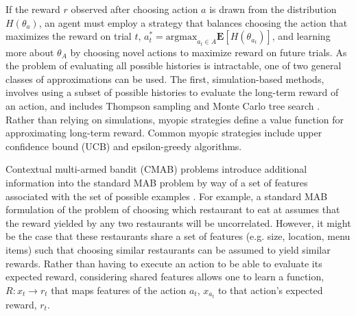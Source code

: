 \documentclass[10pt,letterpaper]{article}
\begin{document}
	If the reward $r$ observed after choosing action $a$ is drawn from the distribution $H(\theta_{a})$, an agent must employ a strategy that balances choosing the action that maximizes the reward on trial $t$, $a_{t}^{*} = \text{argmax}_{a_{t} \in A} \mathbf{E}[H(\theta_{a_{t}})]$, and learning more about $\theta_{A}$ by choosing novel actions to maximize reward on future trials. As the problem of evaluating all possible histories is intractable, one of two general classes of approximations can be used. The first, simulation-based methods, involves using a subset of possible histories to evaluate the long-term reward of an action, and includes Thompson sampling \citep{Thompson} and Monte Carlo tree search \citep{Coulom2007}. Rather than relying on simulations, myopic strategies define a value function for approximating long-term reward. Common myopic strategies include upper confidence bound (UCB) \citep{Agrawal} and epsilon-greedy \citep{Sutton1998a} algorithms.
	
	Contextual multi-armed bandit (CMAB) problems introduce additional information into the standard MAB problem by way of a set of features associated with the set of possible examples \citep{Langford}. For example, a standard MAB formulation of the problem of choosing which restaurant to eat at assumes that the reward yielded by any two restaurants will be uncorrelated. However, it might be the case that these restaurants share a set of features (e.g. size, location, menu items) such that choosing similar restaurants can be assumed to yield similar rewards. Rather than having to execute an action to be able to evaluate its expected reward, considering shared features allows one to learn a function, $R: x_{t} \to r_{t}$ that maps features of the action $a_{t}$, $x_{a_{t}}$ to that action's expected reward, $r_{t}$.
	
\end{document}
